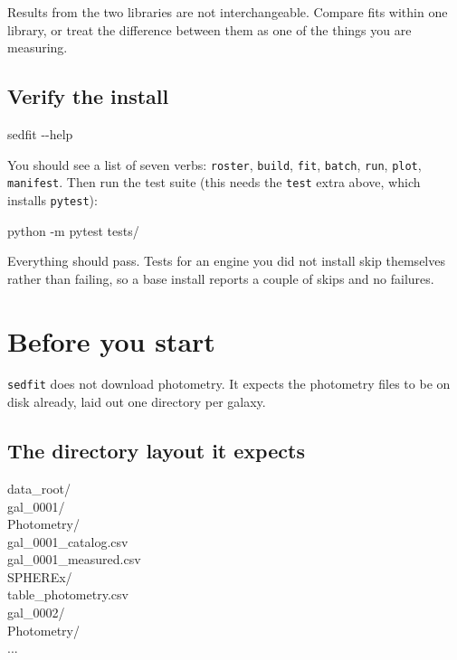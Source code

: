 \documentclass[11pt]{article}
\newcommand{\cmdline}[1]{\begin{cmd}\ttfamily #1\end{cmd}}
\begin{document}
Results from the two libraries are not interchangeable. Compare fits
within one library, or treat the difference between them as one of the
things you are measuring.

\subsection{Verify the install}

\cmdline{sedfit -{}-help}

You should see a list of seven verbs: \texttt{roster}, \texttt{build},
\texttt{fit}, \texttt{batch}, \texttt{run}, \texttt{plot},
\texttt{manifest}. Then run the test suite (this needs the
\texttt{test} extra above, which installs \texttt{pytest}):

\cmdline{python -m pytest tests/}

Everything should pass. Tests for an engine you did not install skip
themselves rather than failing, so a base install reports a couple of
skips and no failures.

\section{Before you start}

\texttt{sedfit} does not download photometry. It expects the photometry
files to be on disk already, laid out one directory per galaxy.

\subsection{The directory layout it expects}

\begin{cmd}\ttfamily
data\_root/\\
\hspace*{2em}gal\_0001/\\
\hspace*{4em}Photometry/\\
\hspace*{6em}gal\_0001\_catalog.csv\\
\hspace*{6em}gal\_0001\_measured.csv\\
\hspace*{6em}SPHEREx/\\
\hspace*{8em}table\_photometry.csv\\
\hspace*{2em}gal\_0002/\\
\hspace*{4em}Photometry/\\
\hspace*{6em}...
\end{cmd}
\end{document}
